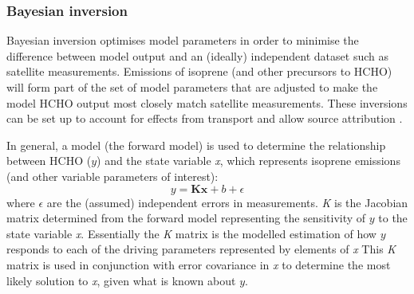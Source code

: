     
    
    
    \subsubsection{Bayesian inversion}
    
      Bayesian inversion optimises model parameters in order to minimise the difference between model output and an (ideally) independent dataset such as satellite measurements.
      Emissions of isoprene (and other precursors to HCHO) will form part of the set of model parameters that are adjusted to make the model HCHO output most closely match satellite measurements.
      These inversions can be set up to account for effects from transport and allow source attribution \parencite[e.g.,][]{Curci2010,FortemsCheiney2012}.
      
      In general, a model (the forward model) is used to determine the relationship between HCHO ($y$) and the state variable \emph{x}, which represents isoprene emissions (and other variable parameters of interest):
      \begin{equation}
        \label{BioIsop:intro:top_down_estimates:eqn_bayesian}
        y=\mathbf{Kx} + b + \epsilon
      \end{equation}
      where $\epsilon$ are the (assumed) independent errors in measurements.
      \emph{K} is the Jacobian matrix determined from the forward model representing the sensitivity of $y$ to the state variable \emph{x}.
      Essentially the \emph{K} matrix is the modelled estimation of how $y$ responds to each of the driving parameters represented by elements of \emph{x}
      This \emph{K} matrix is used in conjunction with error covariance in \emph{x} to determine the most likely solution to \emph{x}, given what is known about $y$. %
      
